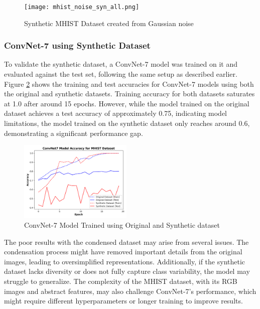 \documentclass[conference, compsoc]{IEEEtran}
\begin{document}
	\begin{figure}[H]
		\centering
		\texttt{[image: mhist\_noise\_syn\_all.png]}
		\caption{Synthetic MHIST Dataset created from Gaussian noise}
		\label{fig:mhist_noise_syn_all}
	\end{figure}
	
	\subsubsection{ConvNet-7 using Synthetic Dataset} \hfill
	
	To validate the synthetic dataset, a ConvNet-7 model was trained on it and evaluated against the test set, following the same setup as described earlier. Figure \ref{fig:mhist_syn_acc} shows the training and test accuracies for ConvNet-7 models using both the original and synthetic datasets. Training accuracy for both datasets saturates at 1.0 after around 15 epochs. However, while the model trained on the original dataset achieves a test accuracy of approximately 0.75, indicating model limitations, the model trained on the synthetic dataset only reaches around 0.6, demonstrating a significant performance gap.
	
	\begin{figure}[H]
		\centering
		\includegraphics[width=0.48\textwidth]{mhist_syn_acc.png}
		\caption{ConvNet-7 Model Trained using Original and Synthetic dataset}
		\label{fig:mhist_syn_acc}
	\end{figure}
	
	The poor results with the condensed dataset may arise from several issues. The condensation process might have removed important details from the original images, leading to oversimplified representations. Additionally, if the synthetic dataset lacks diversity or does not fully capture class variability, the model may struggle to generalize. The complexity of the MHIST dataset, with its RGB images and abstract features, may also challenge ConvNet-7's performance, which might require different hyperparameters or longer training to improve results.
	
\end{document}
